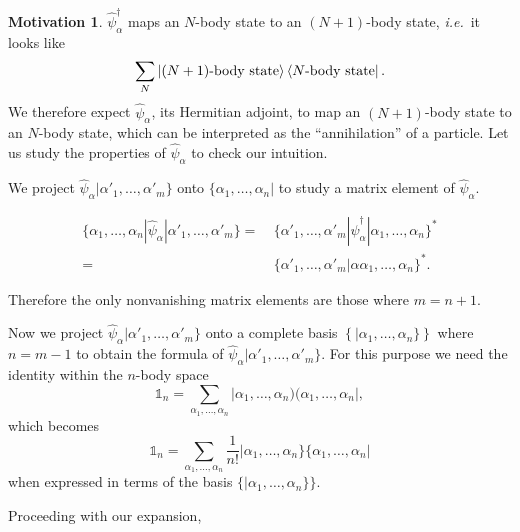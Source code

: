 \documentclass{article}
\theoremstyle{definition}
\newtheorem{mot}{Motivation}[section]
\numberwithin{equation}{section}
\begin{document}
\begin{mot}
    $\hat{\psi}^{\dagger}_{\alpha}$
    maps an $N$-body state to an $(N+1)$-body 
    state, \textit{i.e.}~it looks like 
    \[
      \sum_{N}\ket{(N+1)\text{-body state}}\bra{N\text{-body state}}.
    \]
    We therefore expect 
    $\hat{\psi}_{\alpha}$, its Hermitian adjoint, 
    to map an $(N+1)$-body state 
    to an $N$-body state, 
    which can be interpreted as the 
    ``annihilation'' of a particle. 
    Let us study the properties of 
    $\hat{\psi}_{\alpha}$ 
    to check our intuition.
\end{mot}

We project 
$\hat{\psi}_{\alpha} |\alpha'_{1}, \ldots ,\alpha'_{m}\}$
onto $\{\alpha_1, \ldots ,\alpha_{n}|$ to 
study a matrix element of $\hat{\psi}_{\alpha}$. 

\begin{align*}
    \{ \alpha_1, \ldots ,\alpha_{n}
    |\hat{\psi}_{\alpha}|
    \alpha'_{1}, \ldots ,\alpha'_{m}\}
    =&\ 
    \{ \alpha'_{1}, \ldots ,\alpha'_{m} |
    \hat{\psi}^{\dagger}_{\alpha}|
    \alpha_1, \ldots ,\alpha_{n}\}
    ^{*}
    \\
    =&\ 
    \{\alpha'_{1}, \ldots ,\alpha'_{m}
    |
    \alpha \alpha_{1}, \ldots ,\alpha_{n}\}
    ^{*}.
\end{align*}

Therefore the only nonvanishing matrix elements 
are those where $m=n+1$.

Now we project 
$\hat{\psi}_{\alpha}|\alpha'_{1}, \ldots ,\alpha'_{m}\}$ 
onto a complete basis $\left\{ |\alpha_1, \ldots ,\alpha_n\} \right\}$ 
where $n=m-1$ 
to obtain the formula of 
$\hat{\psi}_{\alpha}|\alpha'_{1}, \ldots ,\alpha'_{m}\}$.
For this purpose we need 
the identity within the $n$-body space 
\[
    \mathds{1}_{n}
    =
    \sum_{\alpha_1, \ldots ,\alpha_{n}}
    |\alpha_1, \ldots ,\alpha_{n})(\alpha_1, \ldots ,\alpha_{n}|, 
\]
which becomes 
\[
    \mathds{1}_{n}
    =
    \sum_{\alpha_1, \ldots ,\alpha_{n}}
    \frac{1}{n!}
    |\alpha_1, \ldots ,\alpha_{n}\}
    \{\alpha_1, \ldots ,\alpha_{n}|
\]
when expressed in terms of the basis 
$\{|\alpha_1, \ldots ,\alpha_{n}\}\}$.

Proceeding with our expansion, 
\end{document}
